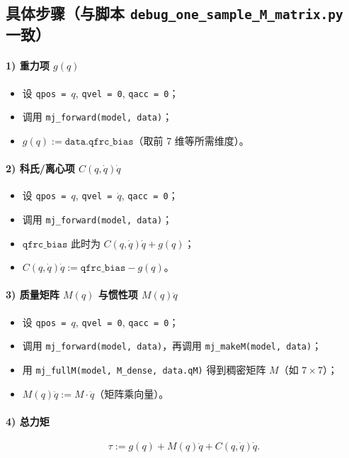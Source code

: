 \documentclass[12pt,a4paper]{article}
\begin{document}
\subsection{具体步骤（与脚本 \texttt{debug\_one\_sample\_M\_matrix.py} 一致）}

\paragraph{1) 重力项 $g(q)$}
\begin{itemize}[leftmargin=*]
  \item 设 \texttt{qpos = $q$}, \texttt{qvel = 0}, \texttt{qacc = 0}；
  \item 调用 \texttt{mj\_forward(model, data)}；
  \item $g(q) := \texttt{data.qfrc\_bias}$（取前 7 维等所需维度）。
\end{itemize}

\paragraph{2) 科氏/离心项 $C(q,\dot{q})\dot{q}$}
\begin{itemize}[leftmargin=*]
  \item 设 \texttt{qpos = $q$}, \texttt{qvel = $\dot{q}$}, \texttt{qacc = 0}；
  \item 调用 \texttt{mj\_forward(model, data)}；
  \item $\texttt{qfrc\_bias}$ 此时为 $C(q,\dot{q})\dot{q} + g(q)$；
  \item $C(q,\dot{q})\dot{q} := \texttt{qfrc\_bias} - g(q)$。
\end{itemize}

\paragraph{3) 质量矩阵 $M(q)$ 与惯性项 $M(q)\ddot{q}$}
\begin{itemize}[leftmargin=*]
  \item 设 \texttt{qpos = $q$}, \texttt{qvel = 0}, \texttt{qacc = 0}；
  \item 调用 \texttt{mj\_forward(model, data)}，再调用 \texttt{mj\_makeM(model, data)}；
  \item 用 \texttt{mj\_fullM(model, M\_dense, data.qM)} 得到稠密矩阵 $M$（如 $7\times 7$）；
  \item $M(q)\ddot{q} := M \cdot \ddot{q}$（矩阵乘向量）。
\end{itemize}

\paragraph{4) 总力矩}
\begin{equation}
  \tau := g(q) + M(q)\ddot{q} + C(q,\dot{q})\dot{q}.
\end{equation}
\end{document}

